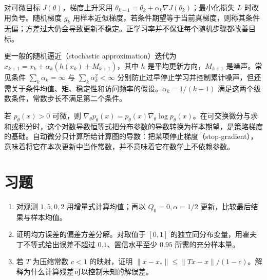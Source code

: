 对可微目标 $J(\theta)$，梯度上升采用 $\theta_{k+1}=\theta_k+\alpha_k\nabla J(\theta_k)$；最小化损失 $L$ 时改用负号。随机梯度 $g_k$ 用样本近似梯度，若条件期望等于当前真梯度，则称其条件无偏；方差过大仍会导致更新不稳定。正学习率并不保证每个随机步骤都改善目标。

更一般的随机逼近（stochastic approximation）迭代为 $x_{k+1}=x_k+\alpha_k(h(x_k)+M_{k+1})$，其中 $h$ 是平均更新方向，$M_{k+1}$ 是噪声。常见条件 $\sum_k\alpha_k=\infty$ 与 $\sum_k\alpha_k^2<\infty$ 分别防止过早停止学习并控制累计噪声，但还需关于条件均值、矩、稳定性和访问频率的假设。$\alpha_k=1/(k+1)$ 满足这两个级数条件，常数步长不满足第二个条件。

若 $p_\theta(x)>0$ 可微，则 $\nabla_\theta p_\theta(x)=p_\theta(x)\nabla_\theta\log p_\theta(x)$。在可交换微分与求和或积分时，这个对数导数恒等式把分布参数的导数转换为样本期望，是策略梯度的基础。自动微分只计算所给计算图的导数：把某项停止梯度（stop-gradient），意味着将它在本次更新中当作常数，并不意味着它在数学上不依赖参数。

\section{习题}
\begin{enumerate}
\item 对观测 $1,5,0,2$ 用增量式计算均值；再以 $Q_0=0,\alpha=1/2$ 更新，比较最后结果与样本均值。
\item 证明均方误差的偏差方差分解。对取值于 $[0,1]$ 的独立同分布变量，用霍夫丁不等式给出误差不超过 $0.1$、置信水平至少 $0.95$ 所需的充分样本量。
\item 若 $T$ 为压缩常数 $c<1$ 的映射，证明 $\|x-x_*\|\leq\|Tx-x\|/(1-c)$。解释为什么计算残差可以控制未知的解误差。
\end{enumerate}






